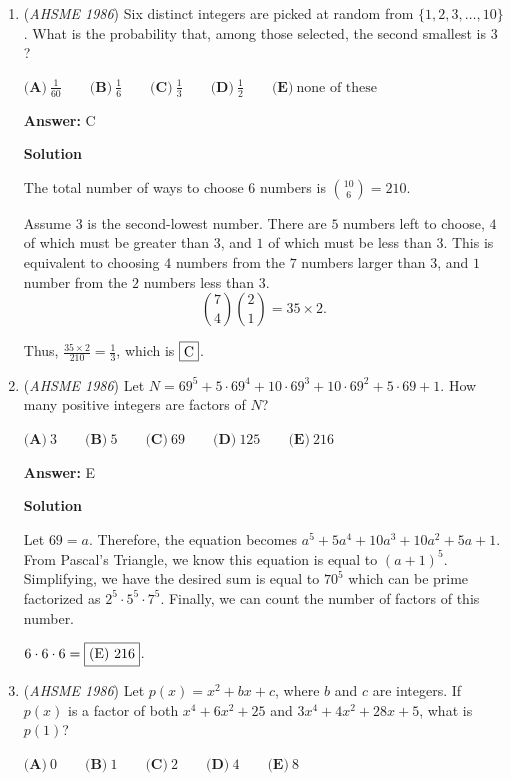 \begin{enumerate}
	\item (\textit{AHSME 1986}) Six distinct integers are picked at random from $\{1,2,3,\ldots,10\}$. What is the probability that, among those selected, the second smallest is $3$?


 $\textbf{(A)}\ \frac{1}{60}\qquad \textbf{(B)}\ \frac{1}{6}\qquad \textbf{(C)}\ \frac{1}{3}\qquad \textbf{(D)}\ \frac{1}{2}\qquad \textbf{(E)}\ \text{none of these}$

 \textbf{Answer: }C



\textbf{Solution}

The total number of ways to choose 6 numbers is ${10\choose 6} = 210$.

 Assume $3$ is the second-lowest number. There are $5$ numbers left to choose, $4$ of which must  be greater than $3$, and $1$ of which must be less than $3$. This is equivalent to choosing $4$ numbers from the $7$ numbers larger than $3$, and $1$ number from the $2$ numbers less than $3$.  
 \[{7\choose 4} {2\choose 1}= 35\times2.\]

 Thus, $\frac{35\times2}{210} = \frac{1}{3}$, which is $\fbox{C}$.

 


	\item (\textit{AHSME 1986}) Let $N = 69^{5} + 5 \cdot 69^{4} + 10 \cdot 69^{3} + 10 \cdot 69^{2} + 5 \cdot 69 + 1$. How many positive integers are factors of $N$?


 $\textbf{(A)}\ 3\qquad \textbf{(B)}\ 5\qquad \textbf{(C)}\ 69\qquad \textbf{(D)}\ 125\qquad \textbf{(E)}\ 216$

 \textbf{Answer: }E



\textbf{Solution}

Let $69=a$. Therefore, the equation becomes $a^5+5a^4+10a^3+10a^2+5a+1$. From Pascal's Triangle, we know this equation is equal to $(a+1)^5$. Simplifying, we have the desired sum is equal to $70^5$ which can be prime factorized as $2^5\cdot5^5\cdot7^5$. Finally, we can count the number of factors of this number.

 $6\cdot6\cdot6=\fbox{(E) 216}$.

 


	\item (\textit{AHSME 1986}) Let $p(x) = x^{2} + bx + c$, where $b$ and $c$ are integers. 
If $p(x)$ is a factor of both $x^{4} + 6x^{2} + 25$ and $3x^{4} + 4x^{2} + 28x + 5$, what is $p(1)$?


 $\textbf{(A)}\ 0\qquad \textbf{(B)}\ 1\qquad \textbf{(C)}\ 2\qquad \textbf{(D)}\ 4\qquad \textbf{(E)}\ 8$


\end{enumerate}
